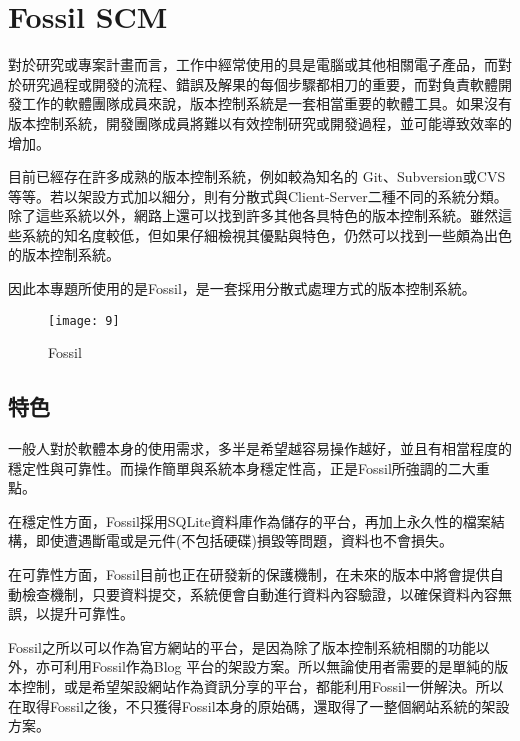 \renewcommand{\baselinestretch}{20} %
\section{Fossil SCM}
\par
\renewcommand{\baselinestretch}{1} %
\twelve 對於研究或專案計畫而言，工作中經常使用的具是電腦或其他相關電子產品，而對於研究過程或開發的流程、錯誤及解果的每個步驟都相刀的重要，而對負責軟體開發工作的軟體團隊成員來說，版本控制系統是一套相當重要的軟體工具。如果沒有版本控制系統，開發團隊成員將難以有效控制研究或開發過程，並可能導致效率的增加。
\\
\par
\renewcommand{\baselinestretch}{1} %
\twelve 目前已經存在許多成熟的版本控制系統，例如較為知名的 Git、Subversion或CVS等等。若以架設方式加以細分，則有分散式與Client-Server二種不同的系統分類。除了這些系統以外，網路上還可以找到許多其他各具特色的版本控制系統。雖然這些系統的知名度較低，但如果仔細檢視其優點與特色，仍然可以找到一些頗為出色的版本控制系統。
\\
\par
\renewcommand{\baselinestretch}{1} %
\twelve 因此本專題所使用的是Fossil，是一套採用分散式處理方式的版本控制系統。
\\
\par
\renewcommand{\baselinestretch}{1.7} %
\begin{figure}[hbt!]
\begin{center}
\texttt{[image: 9]}
\caption{\large Fossil}\label{fig.Fossil}
\end{center}
\end{figure}
\par

\renewcommand{\baselinestretch}{20} %
\subsection{特色}
\par
\renewcommand{\baselinestretch}{1} %
\twelve 一般人對於軟體本身的使用需求，多半是希望越容易操作越好，並且有相當程度的穩定性與可靠性。而操作簡單與系統本身穩定性高，正是Fossil所強調的二大重點。
\\
\par
\renewcommand{\baselinestretch}{1} %
\twelve 在穩定性方面，Fossil採用SQLite資料庫作為儲存的平台，再加上永久性的檔案結構，即使遭遇斷電或是元件(不包括硬碟)損毀等問題，資料也不會損失。
\\
\par
\renewcommand{\baselinestretch}{1} %
\twelve 在可靠性方面，Fossil目前也正在研發新的保護機制，在未來的版本中將會提供自動檢查機制，只要資料提交，系統便會自動進行資料內容驗證，以確保資料內容無誤，以提升可靠性。
\\
\par
\renewcommand{\baselinestretch}{1} %
\twelve Fossil之所以可以作為官方網站的平台，是因為除了版本控制系統相關的功能以外，亦可利用Fossil作為Blog 平台的架設方案。所以無論使用者需要的是單純的版本控制，或是希望架設網站作為資訊分享的平台，都能利用Fossil一併解決。所以在取得Fossil之後，不只獲得Fossil本身的原始碼，還取得了一整個網站系統的架設方案。
\par

